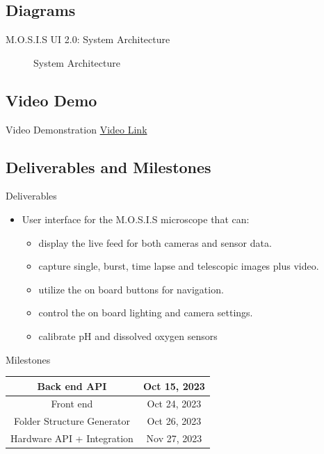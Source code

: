 \documentclass[17pt, aspectratio=169]{beamer}
\begin{document}
\subsection*{Diagrams}\begin{frame}{M.O.S.I.S UI 2.0: System Architecture}
	\begin{figure}
		\caption{System Architecture}
	\end{figure}
\end{frame}
\subsection{Video Demo}
\begin{frame}{Video Demonstration}
	\href{https://youtu.be/JZFvu8QhQfI}{Video Link}
\end{frame}
\subsection*{Deliverables and Milestones}
\begin{frame}{Deliverables}
	\begin{itemize}
		\item User interface for the M.O.S.I.S microscope that can:
		      \begin{itemize}
			      \item display the live feed for both cameras and sensor data.
			      \item capture single, burst, time lapse and telescopic images plus video.
			      \item utilize the on board buttons for navigation.
			      \item control the on board lighting and camera settings.
			      \item calibrate pH and dissolved oxygen sensors
		      \end{itemize}
	\end{itemize}

\end{frame}
\begin{frame}{Milestones}
	\begin{center}
		\begin{tabular}{||c | c||}
			\hline
			Back end API               & Oct 15, 2023 \\
			\hline
			Front end                  & Oct 24, 2023 \\
			\hline
			Folder Structure Generator & Oct 26, 2023 \\
			\hline
			Hardware API + Integration & Nov 27, 2023 \\
			\hline
		\end{tabular}
	\end{center}
\end{frame}
\end{document}
